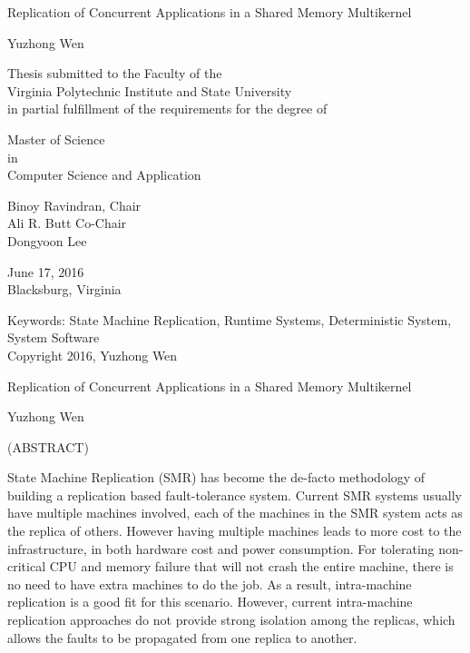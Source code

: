 \documentclass[12pt]{report}
\begin{document}
\thispagestyle{empty}
\begin{center}

{\Large 
Replication of Concurrent Applications in a Shared Memory Multikernel
}

\vfill

Yuzhong Wen

\vfill

Thesis submitted to the Faculty of the \\
Virginia Polytechnic Institute and State University \\
in partial fulfillment of the requirements for the degree of

\vfill

Master of Science \\
in \\
Computer Science and Application

\vfill

Binoy Ravindran, Chair \\
Ali R. Butt Co-Chair \\
Dongyoon Lee

\vfill

June 17, 2016 \\
Blacksburg, Virginia

\vfill

Keywords: State Machine Replication, Runtime Systems, Deterministic System, System Software
\\
Copyright 2016, Yuzhong Wen

\end{center}

\pagebreak

\thispagestyle{empty}
\begin{center}

{\large Replication of Concurrent Applications in a Shared Memory Multikernel}

\vfill

Yuzhong Wen

\vfill

(ABSTRACT)

\vfill

\end{center}
State Machine Replication (SMR) has become the de-facto methodology of building a replication based fault-tolerance system. Current SMR systems usually have multiple machines involved, each of the machines in the SMR system acts as the replica of others. However having multiple machines leads to more cost to the infrastructure, in both hardware cost and power consumption. For tolerating non-critical CPU and memory failure that will not crash the entire machine, there is no need to have extra machines to do the job. 
As a result, intra-machine replication is a good fit for this scenario. However, current intra-machine replication approaches do not provide strong isolation among the replicas, which allows the faults to be propagated from one replica to another. 
\end{document}
